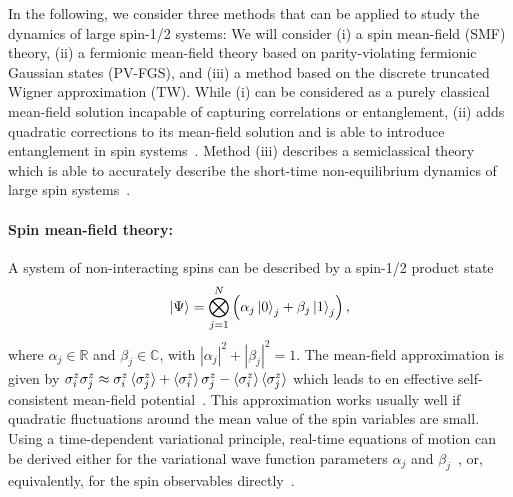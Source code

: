 \documentclass[aps,pra,reprint,amssymb,superscriptaddress]{revtex4-2}
\begin{document}
In the following, we consider three methods that can be applied to study the dynamics of large spin-1/2 systems: We will consider (i) a spin mean-field (SMF) theory, (ii) a fermionic mean-field theory based on parity-violating fermionic Gaussian states (PV-FGS), and (iii) a method based on the discrete truncated Wigner approximation (TW). While (i) can be considered as a purely classical mean-field solution incapable of capturing correlations or entanglement, (ii) adds quadratic corrections to its mean-field solution and is able to introduce  entanglement in spin systems~\cite{peschel_reduced_2009,kaicher_mean-field_2023}. Method (iii) describes a semiclassical theory which is able to accurately describe the  short-time non-equilibrium dynamics of large spin systems~\cite{schachenmayer_many-body_2015}. 

\paragraph{Spin mean-field theory:}
A system of non-interacting spins can be described by a  spin-1/2 product state 
\begin{align}
    \ket{\Psi}  =  \bigotimes_{j=1}^N \left(\alpha_j\ket{0}_j + \beta_j\ket{1}_j\right),\label{n109}
\end{align}
where $\alpha_j\in \mathds R$ and $\beta_j\in\mathds C$, with $
|\alpha_j|^2 + |\beta_j|^2=1$. The mean-field approximation is given by  $\sigma^z_i \sigma^z_j\approx \sigma^z_i \braket{\sigma^z_j} +  \braket{\sigma^z_i}\sigma^z_j-\braket{\sigma^z_i}\braket{\sigma^z_j}$ which leads to en effective self-consistent mean-field potential~\cite{weiss_hypothese_1907}. This approximation works usually well if quadratic fluctuations around the mean value of the spin variables are small. Using a time-dependent variational principle, real-time equations of motion can be derived either for the variational wave function parameters $\alpha_j$ and $\beta_j$~\cite{mauron_predicting_2025}, or, equivalently, for the spin observables directly~\cite{schachenmayer_many-body_2015}.
\end{document}
